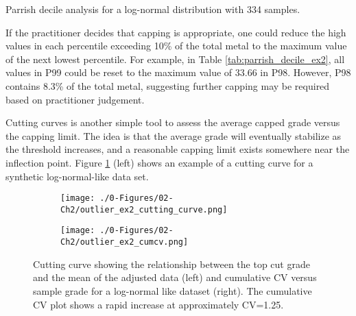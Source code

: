 \begin{table}[!htb]
    \centering
    \caption{Parrish decile analysis for a log-normal distribution with 334 samples. }
    \resizebox{1\width}{!}{}
    \label{tab:parrish_decile_ex2}
\end{table}

If the practitioner decides that capping is appropriate, one could reduce the high values in each percentile exceeding 10\% of the total metal to the maximum value of the next lowest percentile. For example, in Table \ref{tab:parrish_decile_ex2}, all values in P99 could be reset to the maximum value of 33.66 in P98. However, P98 contains 8.3\% of the total metal, suggesting further capping may be required based on practitioner judgement.

Cutting curves \citep{roscoe1996cutting,leuangthong2015dealing} is another simple tool to assess the average capped grade versus the capping limit. The idea is that the average grade will eventually stabilize as the threshold increases, and a reasonable capping limit exists somewhere near the inflection point. Figure \ref{fig:cutting_cv} (left) shows an example of a cutting curve for a synthetic log-normal-like data set.


\begin{figure}[!htb]
    \begin{subfigure}{0.5\textwidth}
        \centering
        \texttt{[image: ./0-Figures/02-Ch2/outlier\_ex2\_cutting\_curve.png]}
    \end{subfigure}
    \begin{subfigure}{0.5\textwidth}
        \centering
        \texttt{[image: ./0-Figures/02-Ch2/outlier\_ex2\_cumcv.png]}
    \end{subfigure}
    \caption{Cutting curve showing the relationship between the top cut grade and the mean of the adjusted data (left) and cumulative \gls{CV} versus sample grade for a log-normal like dataset (right). The cumulative \gls{CV} plot shows a rapid increase at approximately CV=1.25.}
    \label{fig:cutting_cv}
\end{figure}

